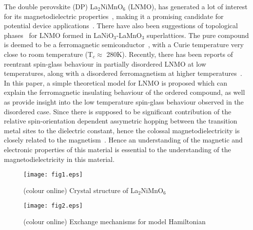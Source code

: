 \documentclass[english,aps,prb,twocolumn,showpacs]{revtex4-1}
\begin{document}
The double perovskite (DP) La$_2$NiMnO$_6$ (LNMO), has generated a lot of interest for its  
magnetodielectric properties~\cite{AdvMat}, making it a promising candidate
 for potential device applications~\cite{Guo}. There have also been   
  suggestions of topological phases~\cite{ArunParam} for LNMO formed in LaNiO$_{3}$-LaMnO$_{3}$ superlattices.
  The pure compound is deemed to be a ferromagnetic semiconductor~\cite{AdvMat,GoodenoughPRB},
  with a Curie temperature very close
 to room temperature (T$_{c}\approx$ 280K).  Recently, there has been reports
 of reentrant spin-glass behaviour in partially disordered LNMO at low temperatures,
 along with a disordered ferromagnetism at higher temperatures~\cite{debraj}. In this paper,
 a simple theoretical model for LNMO is proposed which can explain the ferromagnetic
 insulating behaviour of the ordered compound, as well as provide insight into the
 low temperature spin-glass behaviour observed in the disordered case. Since there is supposed to be 
 significant contribution of the relative spin-orientation dependent assymetric hopping between 
 the transition metal sites to the dielectric constant, hence the colossal magnetodielectricity
 is closely related to the magnetism~\cite{debraj}. Hence an understanding of the magnetic and electronic
 properties of this material is essential to the understanding of the magnetodielectricity in this material. 

 

\begin{figure}
\texttt{[image: fig1.eps]} \\
\caption{(colour online) Crystal structure of La$_{2}$NiMnO$_{6}$ }
\label{structure}
\end{figure}



\begin{figure}
\texttt{[image: fig2.eps]} \\
\caption{(colour online) Exchange mechanisms for model Hamiltonian}
\label{exchangepath}
\end{figure}
\end{document}
